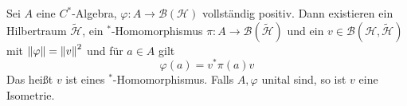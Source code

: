\begin{satz}[label=satz:319,name={Stinespring}]
	Sei $A$ eine $C^*$-Algebra, $\varphi \colon A \to \mathcal{B}(\mathcal{H})$ vollständig positiv.
	Dann existieren ein Hilbertraum $\tilde{\mathcal{H}}$, ein $^*$-Homomorphismus $\pi \colon A \to \mathcal{B}(\tilde{\mathcal{H}})$ und ein $v \in \mathcal{B}(\mathcal{H},\tilde{\mathcal{H}})$ mit $\norm*{\varphi} = \norm*{v}^2$ und für $a \in A$ gilt 
	\[
		\varphi(a) = v^* \pi(a) v
	\]
	Das heißt $v$ ist  eines $^*$-Homomorphismus.
	Falls $A,\varphi$ unital sind, so ist $v$ eine Isometrie.
\end{satz}
